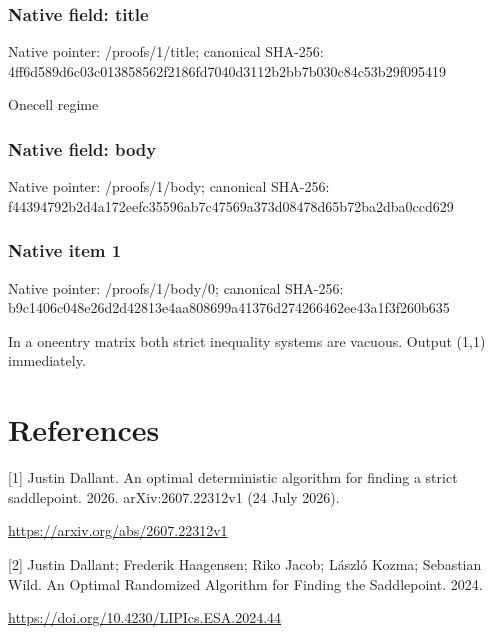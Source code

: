 \documentclass[10pt,a4paper]{article}
\begin{document}
\subsubsection{Native field: title}


Native pointer: /proofs/1/title; canonical SHA-256: 4ff6d589d6c03c013858562f\allowbreak{}2186fd7040d3112b2bb7b030\allowbreak{}c84c53b29f095419


Onecell regime


\subsubsection{Native field: body}


Native pointer: /proofs/1/body; canonical SHA-256: f44394792b2d4a172eefc355\allowbreak{}96ab7c47569a373d08478d65\allowbreak{}b72ba2dba0ccd629



\subsubsection{Native item 1}


Native pointer: /proofs/1/body/0; canonical SHA-256: b9c1406c048e26d2d42813e4\allowbreak{}aa808699a41376d274266462\allowbreak{}ee43a1f3f260b635


In a oneentry matrix both strict inequality systems are vacuous. Output (1,1) immediately.


\section{References}


[1] Justin Dallant. An optimal deterministic algorithm for finding a strict saddlepoint. 2026. arXiv:2607.22312v1 (24 July 2026).



\url{https://arxiv.org/abs/2607.22312v1}



[2] Justin Dallant; Frederik Haagensen; Riko Jacob; László Kozma; Sebastian Wild. An Optimal Randomized Algorithm for Finding the Saddlepoint. 2024.



\url{https://doi.org/10.4230/LIPIcs.ESA.2024.44}
\end{document}
